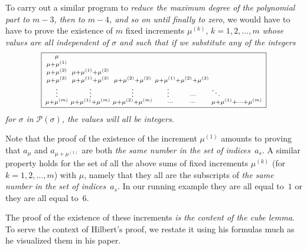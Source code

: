 \documentclass{article}
\theoremstyle{plain}
\theoremstyle{definition}
\begin{document}
To carry out a similar program to \emph{reduce the maximum degree of
the polynomial part to $m - 3$, then to $m - 4$, and so on until
finally to zero}, we would have to have to prove the existence of $m$
fixed increments $\mu^{(k)}$, $k = 1,2,\ldots,m$ \emph{whose values
are all independent of $\sigma$ and such that if we substitute any of
the integers}
\[
\boxed{\begin{smallmatrix} %
\mu &  &  &  & 
\\
\mu + \mu^{(1)} &  &  &  & 
\\
\mu + \mu^{(2)} & \mu + \mu^{(1)} + \mu^{(2)} & & & 
\\
\mu + \mu^{(3)} & \mu + \mu^{(1)} + \mu^{(3)}
& \mu + \mu^{(2)} + \mu^{(3)} 
& \mu + \mu^{(1)} + \mu^{(2)} + \mu^{(3)} & 
\\
\vdots & \vdots & \vdots & \vdots \hspace*{2.5em} \cdots 
& \ddots \hfill 
\\
\mu + \mu^{(m)} & \mu + \mu^{(1)} + \mu^{(m)}
& \mu + \mu^{(2)} + \mu^{(m)} & \cdots \qquad \cdots
& \mu + \mu^{(1)} +\cdots+ \mu^{(m)}
\end{smallmatrix}}
\]
\emph{for $\sigma$ in $\mathcal{P}(\sigma)$, the values will all be
integers}.

Note that the proof of the existence of the increment $\mu^{(1)}$
amounts to proving that $a_{\mu}$ and $a_{\mu + \mu^{(1)}}$ are both
\emph{the same number in the set of indices~$a_s$}. A similar property
holds for the set of all the above sums of fixed increments
$\mu^{(k)}$ (for $k = 1,2,\dots,m$) with $\mu$, namely that they all
are the subscripts of \emph{the same number in the set of
indices~$a_s$}. In our running example they are all equal to~$1$ or
they are all equal to~$6$.

The proof of the existence of these increments \emph{is the content of the cube lemma}.
To serve the context of Hilbert's proof, we restate it using his formulas much as he visualized them in his paper.
\end{document}
